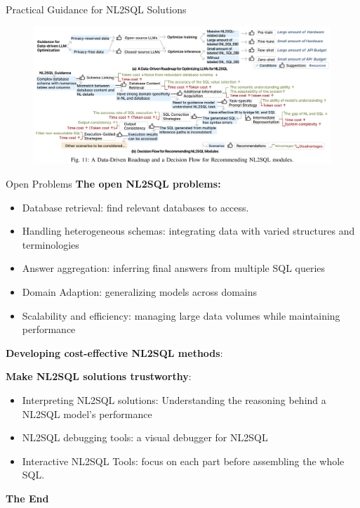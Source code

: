 \documentclass[aspectratio=169,xcolor=dvipsnames]{beamer}
\begin{document}

\begin{frame}{Practical Guidance for NL2SQL Solutions}
    \begin{figure}
        \includegraphics[width=\linewidth]{assets/roadmap.png}
    \end{figure}
\end{frame}


\begin{frame}{Open Problems}
\textbf{The open NL2SQL problems: }
\begin{itemize}
    \item Database retrieval: find relevant databases to access.
    \item Handling heterogeneous schemas: integrating data with varied structures and terminologies
    \item Answer aggregation: inferring final answers from multiple SQL queries 
    \item Domain Adaption: generalizing models across domains
    \item Scalability and efficiency: managing large data volumes while maintaining performance
\end{itemize}
\textbf{Developing cost-effective NL2SQL methods}:

\textbf{Make NL2SQL solutions trustworthy}:
\begin{itemize}
    \item Interpreting NL2SQL solutions: Understanding the reasoning behind a NL2SQL model’s performance
    \item NL2SQL debugging tools: a visual debugger for NL2SQL
    \item Interactive NL2SQL Tools: focus on each part before assembling the whole SQL.
\end{itemize}

\end{frame}


\begin{frame}
    \Huge{\centerline{\textbf{The End}}}
\end{frame}
\end{document}
